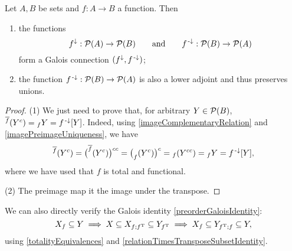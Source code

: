 \begin{corollary} \label{functionImagePreimageGaloisConnection}
Let $A,B$ be sets and $f:A\to B$ a function. Then
\begin{enumerate}
\item the functions
\[ f^\downarrow: \operatorname{\mathcal{P}}(A)\to\operatorname{\mathcal{P}}(B) \qquad\text{and}\qquad f^{\text{\hspace{0.15em}-}\downarrow}: \operatorname{\mathcal{P}}(B)\to\operatorname{\mathcal{P}}(A) \]
form a Galois connection $(f^\downarrow, f^{\text{\hspace{0.15em}-}\downarrow})$;
\item the function $f^{\text{\hspace{0.15em}-}\downarrow}: \operatorname{\mathcal{P}}(B)\to\operatorname{\mathcal{P}}(A)$ is also a lower adjoint and thus preserves unions.
\end{enumerate}
\end{corollary}
\begin{proof}
(1) We just need to prove that, for arbitrary $Y\in \operatorname{\mathcal{P}}(B)$, ${^{\overline{f}}(Y^c)} = {_fY} = f^{\text{\hspace{0.15em}-}\downarrow}[Y]$. Indeed, using \ref{imageComplementaryRelation} and \ref{imagePreimageUniqueness}, we have
\[ {^{\overline{f}}(Y^c)} = \big(^{\overline{f}}(Y^c)\big)^{cc} = \big(_f(Y^c)\big)^c = {_f(Y^{cc})} = {_fY} = f^{\text{\hspace{0.15em}-}\downarrow}[Y], \]
where we have used that $f$ is total and functional.

(2) The preimage map it the image under the transpose.
\end{proof}
We can also directly verify the Galois identity \ref{preorderGaloisIdentity}:
\[ X_f \subseteq Y \implies X \subseteq X_{f;f^{\mathrm{T}}} \subseteq Y_{f^{\mathrm{T}}} \implies X_f \subseteq Y_{f^{\mathrm{T}};f} \subseteq Y, \]
using \ref{totalityEquivalences} and \ref{relationTimesTransposeSubsetIdentity}.

